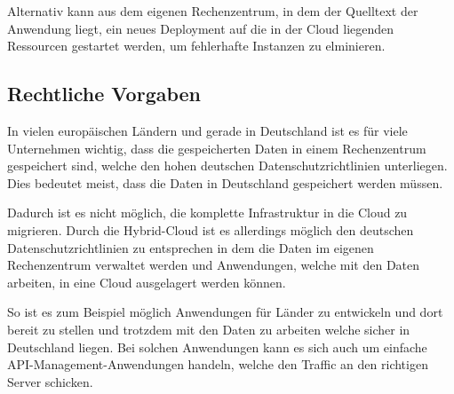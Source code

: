 Alternativ kann aus dem eigenen Rechenzentrum, in dem der Quelltext der Anwendung liegt, ein neues Deployment auf die
in der Cloud liegenden Ressourcen gestartet werden, um fehlerhafte Instanzen zu elminieren.

\subsection{Rechtliche Vorgaben}
In vielen europäischen Ländern und gerade in Deutschland ist es für viele Unternehmen wichtig, dass die gespeicherten
Daten in einem Rechenzentrum gespeichert sind, welche den hohen deutschen Datenschutzrichtlinien unterliegen. Dies bedeutet
meist, dass die Daten in Deutschland gespeichert werden müssen.

Dadurch ist es nicht möglich, die komplette Infrastruktur in die Cloud zu migrieren. Durch die Hybrid-Cloud ist es allerdings
möglich den deutschen Datenschutzrichtlinien zu entsprechen in dem die Daten im eigenen Rechenzentrum verwaltet werden
und Anwendungen, welche mit den Daten arbeiten, in eine Cloud ausgelagert werden können.

So ist es zum Beispiel möglich Anwendungen für Länder zu entwickeln und dort bereit zu stellen und trotzdem mit den Daten
zu arbeiten welche sicher in Deutschland liegen. Bei solchen Anwendungen kann es sich auch um einfache
API-Management-Anwendungen handeln, welche den Traffic an den richtigen Server schicken.